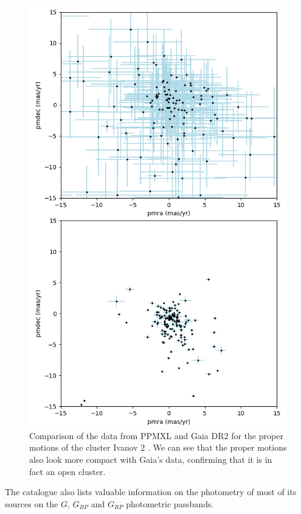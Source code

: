 \documentclass[twocolumn]{revtex4}
\begin{document}
\begin{figure}[h!]
\centering
\includegraphics[scale=0.45]{ppmxl_vs_gaia_motions}
\caption{Comparison of the data from PPMXL and Gaia DR2 for the proper motions of the cluster Ivanov 2 \cite{ivanov}. We can see that the proper motions also look more compact with Gaia's data, confirming that it is in fact an open cluster.}
\label{ppmxl_vs_gaiadr2}
\end{figure}

The catalogue also lists valuable information on the photometry of most of its sources on the $G$, $G_{BP}$ and $G_{RP}$ photometric passbands.
\end{document}
